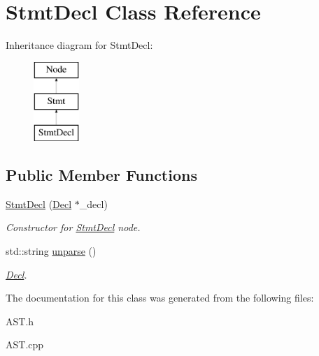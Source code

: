 \hypertarget{classStmtDecl}{\section{Stmt\-Decl Class Reference}
\label{classStmtDecl}
}
Inheritance diagram for Stmt\-Decl\-:\begin{figure}[H]
\begin{center}
\leavevmode
\includegraphics[height=3.000000cm]{classStmtDecl}
\end{center}
\end{figure}
\subsection*{Public Member Functions}
\begin{DoxyCompactItemize}
\item 
\hypertarget{classStmtDecl_a19859964c738ebc7202da1d2086cf689}{\hyperlink{classStmtDecl_a19859964c738ebc7202da1d2086cf689}{Stmt\-Decl} (\hyperlink{classDecl}{Decl} $\ast$\-\_\-decl)}\label{classStmtDecl_a19859964c738ebc7202da1d2086cf689}

\begin{DoxyCompactList}\small\item\em Constructor for \hyperlink{classStmtDecl}{Stmt\-Decl} node. \end{DoxyCompactList}\item 
\hypertarget{classStmtDecl_a6c2aa9409f6cc55a42d1982fce5af0be}{std\-::string \hyperlink{classStmtDecl_a6c2aa9409f6cc55a42d1982fce5af0be}{unparse} ()}\label{classStmtDecl_a6c2aa9409f6cc55a42d1982fce5af0be}

\begin{DoxyCompactList}\small\item\em \hyperlink{classDecl}{Decl}. \end{DoxyCompactList}\end{DoxyCompactItemize}


The documentation for this class was generated from the following files\-:\begin{DoxyCompactItemize}
\item 
A\-S\-T.\-h\item 
A\-S\-T.\-cpp\end{DoxyCompactItemize}
